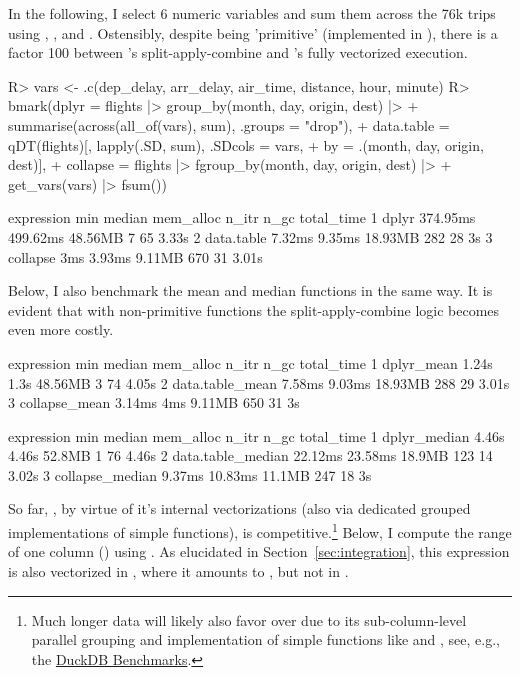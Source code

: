 \documentclass[nojss]{jss} %
\newcommand{\fct}[1]{\code{#1()}}
\begin{document}
%
In the following, I select 6 numeric variables and sum them across the 76k trips using , , and . Ostensibly, despite \fct{sum} being 'primitive' (implemented in ), there is a factor 100 between 's split-apply-combine and 's fully vectorized execution.
%
\begin{Schunk}
\begin{Sinput}
R> vars <- .c(dep_delay, arr_delay, air_time, distance, hour, minute)
R> bmark(dplyr = flights |> group_by(month, day, origin, dest) |>
+                  summarise(across(all_of(vars), sum), .groups = "drop"),
+        data.table = qDT(flights)[, lapply(.SD, sum), .SDcols = vars,
+                                  by = .(month, day, origin, dest)],
+        collapse = flights |> fgroup_by(month, day, origin, dest) |>
+                     get_vars(vars) |> fsum())
\end{Sinput}
\begin{Soutput}
  expression      min   median mem_alloc n_itr n_gc total_time
1      dplyr 374.95ms 499.62ms   48.56MB     7   65      3.33s
2 data.table   7.32ms   9.35ms   18.93MB   282   28         3s
3   collapse      3ms   3.93ms    9.11MB   670   31      3.01s
\end{Soutput}
\end{Schunk}
%
Below, I also benchmark the mean and median functions in the same way. It is evident that with non-primitive  functions the split-apply-combine logic becomes even more costly.
%
\begin{Schunk}
\begin{Soutput}
       expression    min median mem_alloc n_itr n_gc total_time
1      dplyr_mean  1.24s   1.3s   48.56MB     3   74      4.05s
2 data.table_mean 7.58ms 9.03ms   18.93MB   288   29      3.01s
3   collapse_mean 3.14ms    4ms    9.11MB   650   31         3s
\end{Soutput}
\begin{Soutput}
         expression     min  median mem_alloc n_itr n_gc total_time
1      dplyr_median   4.46s   4.46s    52.8MB     1   76      4.46s
2 data.table_median 22.12ms 23.58ms    18.9MB   123   14      3.02s
3   collapse_median  9.37ms 10.83ms    11.1MB   247   18         3s
\end{Soutput}
\end{Schunk}
%
So far, , by virtue of it's internal vectorizations (also via dedicated grouped  implementations of simple functions), is competitive.\footnote{Much longer data will likely also favor  over  due to its sub-column-level parallel grouping and implementation of simple functions like \fct{sum} and \fct{mean}, see, e.g., the \href{https://duckdblabs.github.io/db-benchmark/}{DuckDB Benchmarks}.} Below, I compute the range of one column () using . As elucidated in Section~\ref{sec:integration}, this expression is also vectorized in , where it amounts to , but not in .
\end{document}
